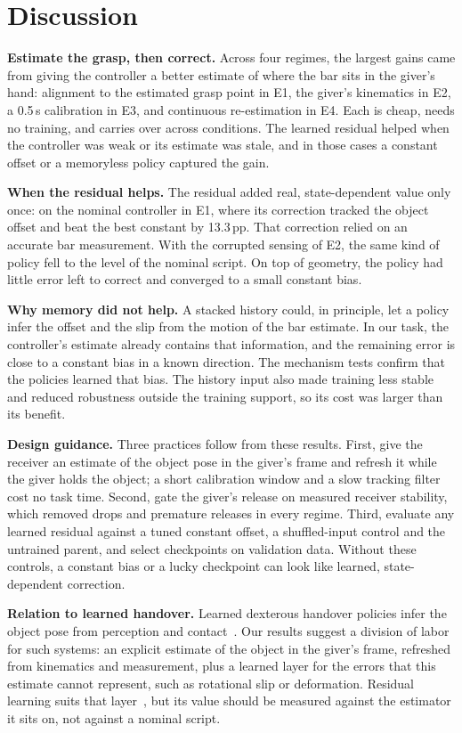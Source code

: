 \documentclass[conference,letterpaper]{IEEEtran}
\newcommand{\pp}{\,pp}
\begin{document}
\section{Discussion}

\textbf{Estimate the grasp, then correct.} Across four regimes, the largest gains came from giving the controller a
better estimate of where the bar sits in the giver's hand: alignment to the estimated grasp point in E1, the giver's
kinematics in E2, a 0.5\,s calibration in E3, and continuous re-estimation in E4. Each is cheap, needs no training,
and carries over across conditions. The learned residual helped when the controller was weak or its estimate was stale,
and in those cases a constant offset or a memoryless policy captured the gain.

\textbf{When the residual helps.} The residual added real, state-dependent value only once: on the nominal
controller in E1, where its correction tracked the object offset and beat the best constant by 13.3\pp. That
correction relied on an accurate bar measurement. With the corrupted sensing of E2, the same kind of policy fell to
the level of the nominal script. On top of geometry, the policy had little error left to correct and converged to a
small constant bias.

\textbf{Why memory did not help.} A stacked history could, in principle, let a policy infer the offset and the slip
from the motion of the bar estimate. In our task, the controller's estimate already contains that information, and
the remaining error is close to a constant bias in a known direction. The mechanism tests confirm that the policies
learned that bias. The history input also made training less stable and reduced robustness outside the training
support, so its cost was larger than its benefit.

\textbf{Design guidance.} Three practices follow from these results. First, give the receiver an estimate of
the object pose in the giver's frame and refresh it while the giver holds the object; a short calibration window and
a slow tracking filter cost no task time. Second, gate the giver's release on measured receiver stability, which
removed drops and premature releases in every regime. Third, evaluate any learned residual against a tuned constant
offset, a shuffled-input control and the untrained parent, and select checkpoints on validation data. Without these
controls, a constant bias or a lucky checkpoint can look like learned, state-dependent correction.

\textbf{Relation to learned handover.} Learned dexterous handover policies infer the object pose from perception
and contact~\cite{frau2025handover}. Our results suggest a division of labor for such systems: an explicit estimate of
the object in the giver's frame, refreshed from kinematics and measurement, plus a learned layer for the errors that
this estimate cannot represent, such as rotational slip or deformation. Residual learning suits that
layer~\cite{johannink2019residual,silver2018residual}, but its value should be measured against the estimator it sits
on, not against a nominal script.
\end{document}
